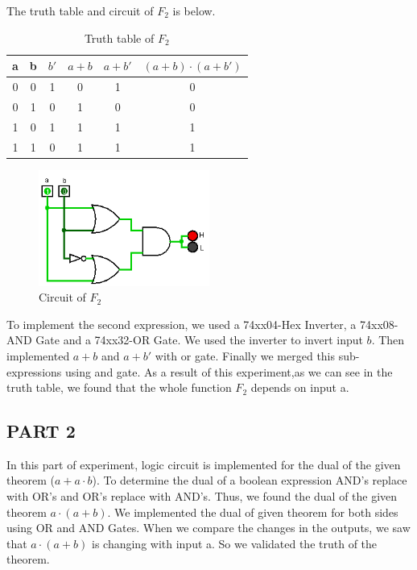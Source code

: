 \documentclass[pdftex,12pt,a4paper]{article}
\begin{document}
The truth table and circuit of $F_2$ is below.

\begin{table}[h]
    \centering
    \begin{tabular}{|c|c|c|c|c|c|}
    \hline
    a & b & $b'$ & $a + b$ & $a + b'$ & $(a + b) \cdot (a + b')$ \\ \hline
    0 & 0 & 1    & 0       & 1        & 0                  \\
    0 & 1 & 0    & 1       & 0        & 0                  \\
    1 & 0 & 1    & 1       & 1        & 1                  \\
    1 & 1 & 0    & 1       & 1        & 1                  \\ \hline
    \end{tabular}
    \caption{Truth table of $F_2$}
    \label{fig2}
\end{table}

\begin{figure}[ht]
	\centering
	\includegraphics[width=0.5\textwidth]{2_1_2.png}	
	\caption{Circuit of $F_2$}
	\label{fig1}
\end{figure}
To implement the second expression, we used a 74xx04-Hex Inverter, a 74xx08-AND Gate and a 74xx32-OR Gate. We used the inverter to invert input $b$. Then implemented $a + b$ and $a + b'$ with or gate. Finally we merged this sub-expressions using and gate. As a result of this experiment,as we can see in the truth table, we found that the whole function $F_2$ depends on input a.

\subsection{PART 2}
In this part of experiment, logic circuit is implemented for the dual of the given theorem ($a + a \cdot b$). To determine the dual of a boolean expression AND's replace with OR's and OR's replace with AND's. Thus, we found the dual of the given theorem $a \cdot (a + b)$. We implemented the dual of given theorem for both sides using OR and AND Gates. When we compare the changes in the outputs, we saw that $a \cdot (a + b)$ is changing with input a. So we validated the truth of the theorem. \\
\end{document}
